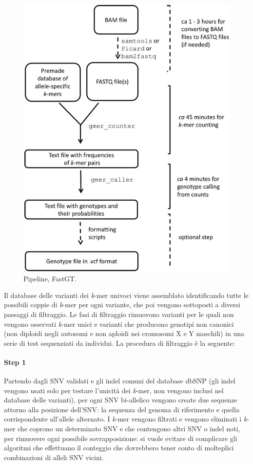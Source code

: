 \documentclass[../main.tex]{subfiles}
\begin{document}
 \begin{figure}[h!]
	\centering
  	\captionsetup{justification=centering}
  	\includegraphics[scale=.25]{images/fastgt-pipeline.jpg}
  	\caption{Pipeline, FastGT.}
  	\label{fig:fastgt}
\end{figure}

Il database delle varianti dei \textit{k}-mer univoci viene assemblato identificando tutte le possibili coppie di \textit{k}-mer per ogni variante, che poi vengono sottoposti a diversi passaggi di filtraggio. Le fasi di filtraggio rimuovono varianti per le quali non vengono osservati \textit{k}-mer unici e varianti che producono genotipi non canonici (non diploidi negli autosomi e non aploidi nei cromosomi X e Y maschili) in una serie di test sequenziati da individui. La procedura di filtraggio è la seguente:

\paragraph{Step 1} Partendo dagli SNV validati e gli indel comuni del database dbSNP (gli indel vengono usati solo per testare l'unicità dei \textit{k}-mer, non vengono inclusi nel database delle varianti), per ogni SNV bi-allelico vengono create due sequenze attorno alla posizione dell'SNV: la sequenza del genoma di riferimento e quella corrispondente all'allele alternato. I \textit{k}-mer vengono filtrati e vengono eliminati i \textit{k}-mer che coprono un determinato SNV e che contengono altri SNV o indel noti, per rimuovere ogni possibile sovrapposizione: si vuole evitare di complicare gli algoritmi che effettuano il conteggio che dovrebbero tener conto di molteplici combinazioni di alleli SNV vicini. 
\end{document}
